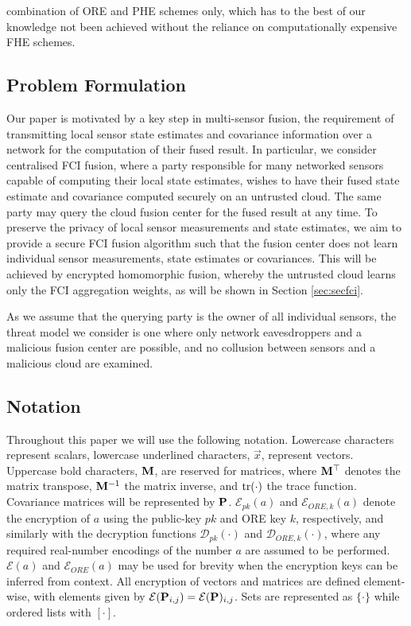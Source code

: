 \documentclass[letterpaper, 10 pt, conference]{ieeeconf}  %
\begin{document}
combination of ORE and PHE schemes only, which has to the best of our knowledge not been achieved without the reliance on computationally expensive FHE schemes.

\subsection{Problem Formulation} \label{subsec:problem_formulation}
Our paper is motivated by a key step in multi-sensor fusion, the requirement of transmitting local sensor state estimates and covariance information over a network for the computation of their fused result. In particular, we consider centralised FCI fusion, where a party responsible for many networked sensors capable of computing their local state estimates, wishes to have their fused state estimate and covariance computed securely on an untrusted cloud. The same party may query the cloud fusion center for the fused result at any time. To preserve the privacy of local sensor measurements and state estimates, we aim to provide a secure FCI fusion algorithm such that the fusion center does not learn individual sensor measurements, state estimates or covariances. This will be achieved by encrypted homomorphic fusion, whereby the untrusted cloud learns only the FCI aggregation weights, as will be shown in Section \ref{sec:secfci}.

As we assume that the querying party is the owner of all individual sensors, the threat model we consider is one where only network eavesdroppers and a malicious fusion center are possible, and no collusion between sensors and a malicious cloud are examined.

\subsection{Notation}
Throughout this paper we will use the following notation. Lowercase characters represent scalars, lowercase underlined characters, $\vec{x}$, represent vectors. Uppercase bold characters, ${{\mathbf{M}}}$, are reserved for matrices, where ${{\mathbf{M}}}^\top$ denotes the matrix transpose, ${{\mathbf{M}}}^{-1}$ the matrix inverse, and $\operatorname{tr}(\cdot)$ the trace function. Covariance matrices will be represented by ${{\mathbf{P}}}$. $\mathcal{E}_{pk}(a)$ and $\mathcal{E}_{ORE,k}(a)$ denote the encryption of $a$ using the public-key $pk$ and ORE key $k$, respectively, and similarly with the decryption functions $\mathcal{D}_{pk}(\cdot)$ and $\mathcal{D}_{ORE,k}(\cdot)$, where any required real-number encodings of the number $a$ are assumed to be performed. $\mathcal{E}(a)$ and $\mathcal{E}_{ORE}(a)$ may be used for brevity when the encryption keys can be inferred from context. All encryption of vectors and matrices are defined element-wise, with elements given by $\mathcal{E}({{\mathbf{P}}}_{i,j}) = \mathcal{E}({{\mathbf{P}}})_{i,j}$. Sets are represented as $\{\cdot\}$ while ordered lists with $[\cdot]$.
\end{document}
